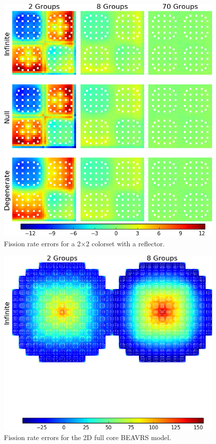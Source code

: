 \begin{figure}[h!]
\centering
\includegraphics[width=\linewidth]{figures/quantification/reflector/fiss-err}
\caption[Fission rate errors for a 2$\times$2 colorset with a reflector]{Fission rate errors for a 2$\times$2 colorset with a reflector.}
\label{fig:chap8-reflector-fiss-err}
\end{figure}

\begin{figure}[h!]
\centering
\includegraphics[width=\linewidth]{figures/quantification/full-core/fiss-err}
\caption[Fission rate errors for the 2D full core \ac{BEAVRS} model]{Fission rate errors for the 2D full core \ac{BEAVRS} model.}
\label{fig:chap8-full-core-fiss-err}
\end{figure}

